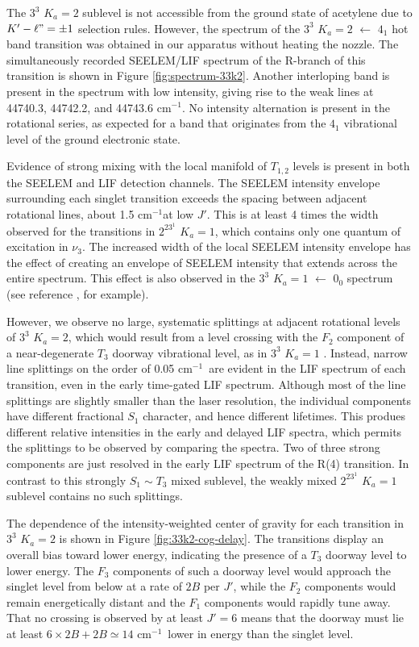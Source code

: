 \documentclass[12pt]{mitthesis}
\newcommand{\rcm}{cm$^{-1}$}
\newcommand{\Ka}[1]{$K_a\!\!=\!#1$}
\begin{document}
The $3^3$ \Ka{2} sublevel is not accessible from the ground state of
acetylene due to $K' - \ell" = \pm 1$ selection rules.  However, the
spectrum of the $3^3$ \Ka{2} $\leftarrow$ $4_1$ hot band transition
was obtained in our apparatus without heating the nozzle.  The
simultaneously recorded SEELEM/LIF spectrum of the R-branch of this
transition is shown in Figure \ref{fig:spectrum-33k2}.  Another
interloping band is present in the spectrum with low intensity,
giving rise to the weak lines at 44740.3, 44742.2, and 44743.6 \rcm.
No intensity alternation is present in the rotational series, as
expected for a band that originates from the $4_1$ vibrational level
of the ground electronic state.

Evidence of strong mixing with the local manifold of $T_{1,2}$ levels
is present in both the SEELEM and LIF detection channels.  The SEELEM
intensity envelope surrounding each singlet transition exceeds the
spacing between adjacent rotational lines, about 1.5 \rcm at low $J'$.
This is at least 4 times the width observed for the transitions in
$2^23^1$ \Ka{1}, which contains only one quantum of excitation in
$\nu_3$.  The increased width of the local SEELEM intensity envelope
has the effect of creating an envelope of SEELEM intensity that
extends across the entire spectrum.  This effect is also observed in
the $3^3$ \Ka{1} $\leftarrow$ $0_0$ spectrum (see reference
\cite{humphrey97}, for example).  

However, we observe no large, systematic splittings at adjacent
rotational levels of $3^3$ \Ka{2}, which would result from a level
crossing with the $F_2$ component of a near-degenerate $T_3$ doorway
vibrational level, as in $3^3$ \Ka{1} \cite{mishra04}.  Instead,
narrow line splittings on the order of 0.05 \rcm\ are evident in the
LIF spectrum of each transition, even in the early time-gated LIF
spectrum.  Although most of the line splittings are slightly smaller
than the laser resolution, the individual components have different
fractional $S_1$ character, and hence different lifetimes.  This
produes different relative intensities in the early and delayed LIF
spectra, which permits the splittings to be observed by comparing the
spectra.  Two of three strong components are just resolved in the
early LIF spectrum of the R(4) transition.  In contrast to this
strongly $S_1 \sim T_3$ mixed sublevel, the weakly mixed $2^23^1$
\Ka{1} sublevel contains no such splittings.

The dependence of the intensity-weighted center of gravity for each
transition in $3^3$ \Ka{2} is shown in Figure
\ref{fig:33k2-cog-delay}.  The transitions display an overall bias
toward lower energy, indicating the presence of a $T_3$ doorway level
to lower energy.  The $F_3$ components of such a doorway level would
approach the singlet level from below at a rate of $2B$ per $J'$,
while the $F_2$ components would remain energetically distant and the
$F_1$ components would rapidly tune away.  That no crossing is
observed by at least $J'=6$ means that the doorway must lie at least
$6\times2B + 2B \simeq 14$ \rcm\ lower in energy than the singlet
level.
\end{document}
